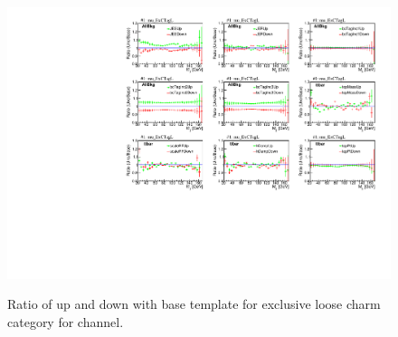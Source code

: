 \newpage
\begin{figure}
    \centering
    {\includegraphics[width=0.95\linewidth]{Image/SYS/RatioBaseSys/mjj_1_mu_ExCTagL.pdf}}
    \caption{ Ratio of up and down with base template for exclusive loose charm category for \mujets channel. }
    \label{fig:shapeVslnN1}
\end{figure}


